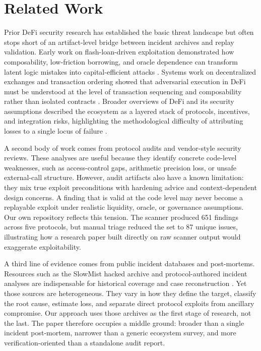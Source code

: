 \section{Related Work}
\label{sec:related-work}

Prior DeFi security research has established the basic threat landscape but often stops short of an artifact-level bridge between incident archives and replay validation. Early work on flash-loan-driven exploitation demonstrated how composability, low-friction borrowing, and oracle dependence can transform latent logic mistakes into capital-efficient attacks \citep{qin2021attacking}. Systems work on decentralized exchanges and transaction ordering showed that adversarial execution in DeFi must be understood at the level of transaction sequencing and composability rather than isolated contracts \citep{daian2020flashboys}. Broader overviews of DeFi and its security assumptions described the ecosystem as a layered stack of protocols, incentives, and integration risks, highlighting the methodological difficulty of attributing losses to a single locus of failure \citep{werner2021sok,zhou2023sok}.

A second body of work comes from protocol audits and vendor-style security reviews. These analyses are useful because they identify concrete code-level weaknesses, such as access-control gaps, arithmetic precision loss, or unsafe external-call structure. However, audit artifacts also have a known limitation: they mix true exploit preconditions with hardening advice and context-dependent design concerns. A finding that is valid at the code level may never become a replayable exploit under realistic liquidity, oracle, or governance assumptions. Our own repository reflects this tension. The scanner produced 651 findings across five protocols, but manual triage reduced the set to 87 unique issues, illustrating how a research paper built directly on raw scanner output would exaggerate exploitability.

A third line of evidence comes from public incident databases and post-mortems. Resources such as the SlowMist hacked archive and protocol-authored incident analyses are indispensable for historical coverage and case reconstruction \citep{slowmistHacked,eulerPostmortem,bonqIncident,lendfmeIncident}. Yet those sources are heterogeneous. They vary in how they define the target, classify the root cause, estimate loss, and separate direct protocol exploits from ancillary compromise. Our approach uses those archives as the first stage of research, not the last. The paper therefore occupies a middle ground: broader than a single incident post-mortem, narrower than a generic ecosystem survey, and more verification-oriented than a standalone audit report.

